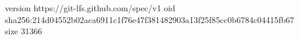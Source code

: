 version https://git-lfs.github.com/spec/v1
oid sha256:214d04552b02aca6911c1f76e47f381482903a13f25f85cc0b6784c04415fb67
size 31366
